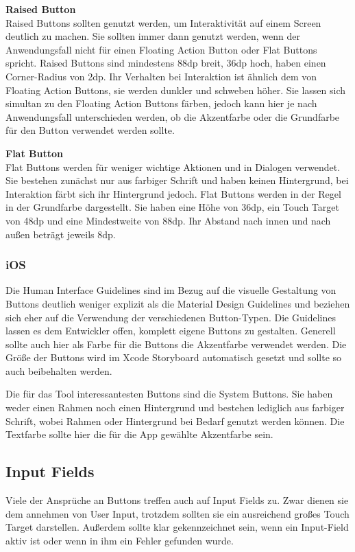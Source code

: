 \textbf{Raised Button} \\
Raised Buttons sollten genutzt werden, um Interaktivität auf einem Screen deutlich zu machen. Sie sollten immer dann genutzt werden, wenn der Anwendungsfall nicht für einen Floating Action Button oder Flat Buttons spricht.
Raised Buttons sind mindestens 88dp breit, 36dp hoch, haben einen Corner-Radius von 2dp. Ihr Verhalten bei Interaktion ist ähnlich dem von Floating Action Buttons, sie werden dunkler und schweben höher.
Sie lassen sich simultan zu den Floating Action Buttons färben, jedoch kann hier je nach Anwendungsfall unterschieden werden, ob die Akzentfarbe oder die Grundfarbe für den Button verwendet werden sollte.

\textbf{Flat Button} \\
Flat Buttons werden für weniger wichtige Aktionen und in Dialogen verwendet. Sie bestehen zunächst nur aus farbiger Schrift und haben keinen Hintergrund, bei Interaktion färbt sich ihr Hintergrund jedoch. Flat Buttons werden in der Regel in der Grundfarbe dargestellt. Sie haben eine Höhe von 36dp, ein Touch Target von 48dp und eine Mindestweite von 88dp. Ihr Abstand nach innen und nach außen beträgt jeweils 8dp.

\subsubsection{iOS}
Die Human Interface Guidelines sind im Bezug auf die visuelle Gestaltung von Buttons deutlich weniger explizit als die Material Design Guidelines und beziehen sich eher auf die Verwendung der verschiedenen Button-Typen. Die Guidelines lassen es dem Entwickler offen, komplett eigene Buttons zu gestalten.
Generell sollte auch hier als Farbe für die Buttons die Akzentfarbe verwendet werden. Die Größe der Buttons wird im Xcode Storyboard automatisch gesetzt und sollte so auch beibehalten werden.

Die für das Tool interessantesten Buttons sind die System Buttons. Sie haben weder einen Rahmen noch einen Hintergrund und bestehen lediglich aus farbiger Schrift, wobei Rahmen oder Hintergrund bei Bedarf genutzt werden können. Die Textfarbe sollte hier die für die App gewählte Akzentfarbe sein.

\subsection{Input Fields}
Viele der Ansprüche an Buttons treffen auch auf Input Fields zu. Zwar dienen sie dem annehmen von User Input, trotzdem sollten sie ein ausreichend großes Touch Target darstellen.  Außerdem sollte klar gekennzeichnet sein, wenn ein Input-Field aktiv ist oder wenn in ihm ein Fehler gefunden wurde.

